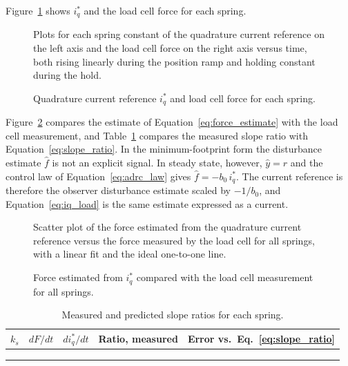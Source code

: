 Figure~\ref{fig:iq_force_time} %
shows $i_q^{*}$ and the load cell force for each spring. %
\begin{figure}[htbp]
	\centering
		{Plots for each spring constant of the quadrature current reference on the left axis and the load cell force on the right axis versus time, both rising linearly during the position ramp and holding constant during the hold.}
	\caption[Current reference and load cell force]{Quadrature current reference $i_q^{*}$ and load cell force for each spring.}
	\label{fig:iq_force_time}
\end{figure}
Figure~\ref{fig:force_estimate} %
compares the estimate of Equation~\eqref{eq:force_estimate} with the load cell measurement, and Table~\ref{tab:exp_slopes} compares the measured slope ratio with Equation~\eqref{eq:slope_ratio}. In the minimum-footprint form the disturbance estimate $\hat{f}$ is not an explicit signal. In steady state, however, $\hat{y} = r$ and the control law of Equation~\eqref{eq:adrc_law} gives $\hat{f} = -b_0\, i_q^{*}$. The current reference is therefore the observer disturbance estimate scaled by $-1/b_0$, and Equation~\eqref{eq:iq_load} is the same estimate expressed as a current.


\begin{figure}[htbp]
	\centering
		{Scatter plot of the force estimated from the quadrature current reference versus the force measured by the load cell for all springs, with a linear fit and the ideal one-to-one line.}
	\caption[Estimated versus measured force]{Force estimated from $i_q^{*}$ compared with the load cell measurement for all springs.}
	\label{fig:force_estimate}
\end{figure}
\begin{table}[htbp]
	\centering
	\caption{Measured and predicted slope ratios for each spring.}
	\vspace{4pt}
	\label{tab:exp_slopes}
	\begin{tabular}{lllll}
		\hline
		$k_s$ & $dF/dt$ & $di_q^{*}/dt$ & Ratio, measured & Error vs.\ Eq.~\eqref{eq:slope_ratio} \\
		\hline
		& & & & \\
		& & & & \\
		& & & & \\
		\hline
	\end{tabular}
\end{table}

